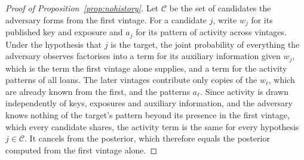 \begin{proof}[Proof of Proposition~\ref{prop:nohistory}]
Let $\mathcal{C}$ be the set of candidates the adversary forms from the first
vintage. For a candidate $j$, write $w_j$ for its published key and exposure and
$a_j$ for its pattern of activity across vintages. Under the hypothesis that $j$ is
the target, the joint probability of everything the adversary observes factorises
into a term for its auxiliary information given $w_j$, which is the term the first
vintage alone supplies, and a term for the activity patterns of all loans. The later
vintages contribute only copies of the $w_\ell$, which are already known from the
first, and the patterns $a_\ell$. Since activity is drawn independently of keys,
exposures and auxiliary information, and the adversary knows nothing of the target's
pattern beyond its presence in the first vintage, which every candidate shares, the
activity term is the same for every hypothesis $j \in \mathcal{C}$. It cancels from
the posterior, which therefore equals the posterior computed from the first vintage
alone.
\end{proof}
